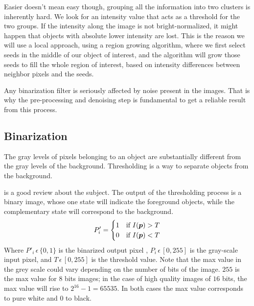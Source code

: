 Easier doesn't mean easy though, grouping all the information into two clusters is inherently hard.
We look for an intensity value that acts as a threshold for the two groups.
If the intensity along the image is not bright-normalized, it might happen that objects with absolute lower intensity are lost.
This is the reason we will use a local approach, using a region growing algorithm, where we first select seeds in the middle of our object of interest, and the algorithm will grow those seeds to fill the whole region of interest, based on intensity differences between neighbor pixels and the seeds.

Any binarization filter is seriously affected by noise present in the images. That is why the pre-processing and denoising step is fundamental to get a reliable result from this process.

\subsection{Binarization}
\label{sub:binarization}
The gray levels of pixels belonging to an object are substantially
different from the gray levels of the background. Thresholding is a way to
separate objects from the background.

\citet{sezgin_survey_2004} is a good review about the subject. The output of the
thresholding process is a binary image, whose one state will indicate the
foreground objects, while the complementary state will correspond to the
background.\\
\begin{equation}
P'_i=
   \begin{cases} 
     1               & \mbox{if } I(\boldsymbol{p}) > T   \\
     0               & \mbox{if } I(\boldsymbol{p}) < T
   \end{cases}
   \label{eq:bin2}
\end{equation}
Where $P'_i\,\epsilon \, \{0{,} 1\}$ is the binarized output pixel , $P_i\,
\epsilon \,[0{,}255]$ is the gray-scale input pixel, and $T\,
\epsilon \,[0{,}255]$ is the threshold value. Note that the max value in the
grey scale could vary depending on the number of bits of the image. $255$ is
the max value for $8$ bits images;
in the case of high quality images of $16$ bits, the max value will rise to
$2^{16} - 1 = 65535$. In both cases the max value corresponds to pure white and
$0$ to black.


